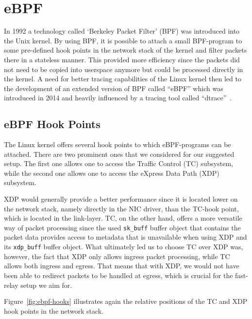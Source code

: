 \section{eBPF}\label{sec:ebpf_bg}
In 1992 a technology called `Berkeley Packet Filter' (BPF) was introduced into 
the Unix kernel.
By using BPF, it is possible to attach a small BPF-program to some pre-defined hook points in 
the network stack of the kernel and filter packets there in a stateless manner.
This provided more efficiency since the packets did not need to be copied into 
userspace anymore but could be processed directly in the kernel.
A need for better tracing capabilities of the Linux kernel then led to the development 
of an extended version of BPF called ``eBPF'' which was introduced in 2014 and 
heavily influenced by a tracing tool called ``dtrace''~\parencite{ebpf-intro-tigera}.

\subsection{eBPF Hook Points}
The Linux kernel offers several hook points to which eBPF-programs can be attached.
There are two prominent ones that we considered for our suggested setup.
The first one allows one to access the Traffic Control (TC) subsystem, while the 
second one allows one to access the eXpress Data Path (XDP) subsystem.

XDP would generally provide a better performance since it is located 
lower on the network stack, namely directly in the NIC driver, than the 
TC-hook point, which is located in the link-layer.
TC, on the other hand, offers a more versatile way of packet processing since 
the used \verb|sk_buff| buffer object that contains the packet data provides access to 
metadata that is unavailable when using XDP and its \verb|xdp_buff| buffer object.
What ultimately led us to choose TC over XDP was, however, the fact that 
XDP only allows ingress packet processing, while TC allows both ingress and egress.
That means that with XDP, we would not have been able to redirect packets to be handled 
at egress, which is crucial for the fast-relay setup we aim for. %

Figure~\autoref{fig:ebpf-hooks} illustrates again the relative positions of the TC and
XDP hook points in the network stack.

